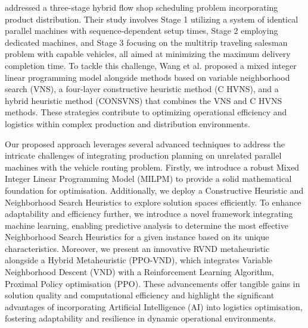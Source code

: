 \documentclass{article}
\begin{document}
\citep{wang2020variable} addressed a three-stage hybrid flow shop scheduling problem incorporating product distribution. Their study involves Stage 1 utilizing a system of identical parallel machines with sequence-dependent setup times, Stage 2 employing dedicated machines, and Stage 3 focusing on the multitrip traveling salesman problem with capable vehicles, all aimed at minimizing the maximum delivery completion time. To tackle this challenge, Wang et al. proposed a mixed integer linear programming model alongside methods based on variable neighborhood search (VNS), a four-layer constructive heuristic method (C HVNS), and a hybrid heuristic method (CONSVNS) that combines the VNS and C HVNS methods. These strategies contribute to optimizing operational efficiency and logistics within complex production and distribution environments.

Our proposed approach leverages several advanced techniques to address the intricate challenges of integrating production planning on unrelated parallel machines with the vehicle routing problem. Firstly, we introduce a robust Mixed Integer Linear Programming Model (MILPM) to provide a solid mathematical foundation for optimisation. Additionally, we deploy a Constructive Heuristic and Neighborhood Search Heuristics to explore solution spaces efficiently. To enhance adaptability and efficiency further, we introduce a novel framework integrating machine learning, enabling predictive analysis to determine the most effective Neighborhood Search Heuristics for a given instance based on its unique characteristics. Moreover, we present an innovative RVND metaheuristic alongside a Hybrid Metaheuristic (PPO-VND), which integrates Variable Neighborhood Descent (VND) with a Reinforcement Learning Algorithm, Proximal Policy optimisation (PPO). These advancements offer tangible gains in solution quality and computational efficiency and highlight the significant advantages of incorporating Artificial Intelligence (AI) into logistics optimisation, fostering adaptability and resilience in dynamic operational environments.
\end{document}
